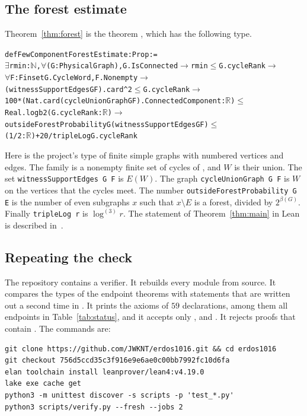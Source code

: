 \documentclass[11pt]{article}
\theoremstyle{definition}
\theoremstyle{remark}
\newcommand{\lgk}[1]{\log^{(#1)}}
\newcommand{\sm}{\setminus}
\begin{document}
\subsection{The forest estimate}

Theorem~\ref{thm:forest} is the theorem , which has the
following type.

{\small
\begin{alltt}
def FewComponentForestEstimate : Prop :=
  \(\exists\) rmin : \(\mathbb{N}\), \(\forall\) (G : PhysicalGraph), G.IsConnected \(\to\) rmin \(\le\) G.cycleRank \(\to\)
    \(\forall\) F : Finset G.CycleWord, F.Nonempty \(\to\)
      (witnessSupportEdges G F).card ^ 2 \(\le\) G.cycleRank \(\to\)
      100 * (Nat.card (cycleUnionGraph G F).ConnectedComponent : \(\mathbb{R}\)) \(\le\)
        Real.logb 2 (G.cycleRank : \(\mathbb{R}\)) \(\to\)
      outsideForestProbability G (witnessSupportEdges G F) \(\le\)
        (1 / 2 : \(\mathbb{R}\)) + 20 / tripleLog G.cycleRank
\end{alltt}}

Here  is the project's type of finite simple graphs with numbered vertices and
edges. The family  is a nonempty finite set of cycles of , and $W$ is their union.
The set \texttt{witnessSupportEdges G F} is $E(W)$. The graph \texttt{cycleUnionGraph G F} is $W$ on
the vertices that the cycles meet. The number \texttt{outsideForestProbability G E} is the number of
even subgraphs $x$ such that $x\sm E$ is a forest, divided by $2^{\beta(G)}$. Finally
\texttt{tripleLog r} is $\lgk3r$. The statement of Theorem~\ref{thm:main} in Lean is described
in~\cite[\S1.2]{KNT}.

\subsection{Repeating the check}

The repository contains a verifier. It rebuilds every module from source. It compares the types of
the endpoint theorems with statements that are written out a second time in
. It prints the axioms of $59$ declarations, among them all endpoints
in Table~\ref{tab:status}, and it accepts only ,  and
. It rejects proofs that contain . The commands are:

{\small
\begin{verbatim}
git clone https://github.com/JWKNT/erdos1016.git && cd erdos1016
git checkout 756d5ccd35c3f916e9e6ae0c00bb7992fc10d6fa
elan toolchain install leanprover/lean4:v4.19.0
lake exe cache get
python3 -m unittest discover -s scripts -p 'test_*.py'
python3 scripts/verify.py --fresh --jobs 2
\end{verbatim}}
\end{document}
